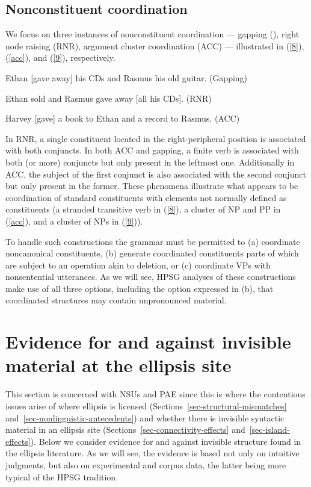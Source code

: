 {\subsection{Nonconstituent coordination}

We focus on three instances of nonconstituent coordination ---  gapping (\citealt{Ross1967}), right node raising (RNR), argument cluster coordination (ACC) --- illustrated in (\ref{8}), (\ref{acc}), and (\ref{9}), respectively.

 \ea Ethan [gave away] his CDs and Rasmus his old guitar. (Gapping)\label{9}\z

 \ea Ethan sold and Rasmus gave away [all his CDs]. (RNR) \label{8}\z

\ea Harvey [gave] a book to Ethan and a record to Rasmus. (ACC) \label{acc}\z

In RNR, a single constituent located in the right-peripheral position is associated with both conjuncts. In both ACC and gapping, a finite verb is associated with both (or more) conjuncts but only present in the leftmost one. Additionally in ACC, the subject of the first conjunct is also associated with the second conjunct but only present in the former. These phenomena illustrate what appears to be coordination of standard constituents with elements not normally defined as constituents (a stranded transitive verb in (\ref{8}), a cluster of NP and PP in (\ref{acc}), and a cluster of NPs in (\ref{9})).
%

 To handle such constructions the grammar must be permitted to (a) coordinate noncanonical constituents, (b) generate coordinated constituents parts of which are subject to an operation akin to deletion, or (c) coordinate VPs with nonsentential utterances. As we will see, HPSG analyses of these constructions make use of all three options, including the option expressed in (b), that coordinated structures may contain unpronounced material.

\section{Evidence for and against invisible material at the ellipsis site}
\label{sec-evidence-for-invisible-material}

This section is concerned with NSUs and PAE since this is where the contentious issues arise of where ellipsis is licensed (Sections~\ref{sec-structural-mismatches} and~\ref{sec-nonlinguistic-antecedents}) and whether there is invisible syntactic material in an ellipsis site (Sections~\ref{sec-connectivity-effects} and~\ref{sec-island-effects}). Below we consider evidence for and against invisible structure found in the ellipsis literature. As we will see, the evidence is based not only on intuitive judgments, but also on experimental and corpus data, the latter being more typical of the HPSG tradition.


}
